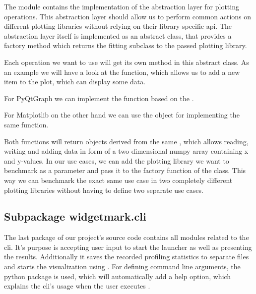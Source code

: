 The module  contains the implementation
of the abstraction layer for plotting operations. This abstraction layer should
allow us to perform common actions on different plotting libraries without
relying on their library specific \gls{api}. The abstraction layer itself is
implemented as an abstract class, that provides a factory method which returns
the fitting subclass to the passed plotting library.



Each operation we want to use will get its own method in this abstract class. As
an example we will have a look at the  function,
which allows us to add a new item to the plot, which can display some data.



For PyQtGraph we can implement the  function based
on the .



For Matplotlib on the other hand we can use the 
object for implementing the same function.



Both functions will return objects derived from the same
, which allows reading, writing and adding
data in form of a two dimensional numpy array containing x and y-values. In our
use cases, we can add the plotting library we want to benchmark as a parameter
and pass it to the factory function  of the
 class. This way we can benchmark the exact
same use case in two completely different plotting libraries without having to
define two separate use cases.

\subsection{Subpackage widgetmark.cli}

The last package of our project's source code contains all modules related to
the \gls{cli}. It's purpose is accepting user input to start the launcher as
well as presenting the results. Additionally it saves the recorded profiling
statistics to separate files and starts the visualization using
. For defining command line arguments, the python
package  is used, which will automatically add a
help option, which explains the \gls{cli}'s usage when the user executes
.

